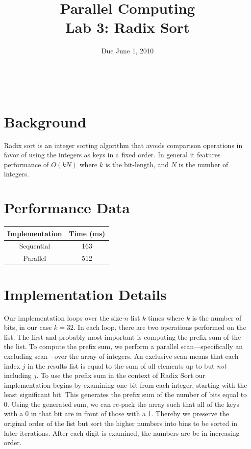\documentclass[12pt]{article}
\title{ Parallel Computing \\ Lab 3: Radix Sort }
\author{\MyFullName}
\date{ Due June 1, 2010 }
\renewcommand{\indent}{\hspace{0.25in}}
\begin{document}
\maketitle
\thispagestyle{empty}
\begin{center}
\end{center}
\setcounter{page}{0}
\newpage

\def\thesection{\Roman{section}.}
\hfill \\
\section{ Background }

\indent Radix sort is an integer sorting algorithm that avoids comparison operations in favor of using the integers as keys in a fixed order. 
In general it features performance of $O(k N)$ where $k$ is the bit-length, and $N$ is the number of integers.

\section{ Performance Data }
\begin{center}
\begin{tabular}{ c | c }

\textbf{Implementation} & \textbf{Time} (ms) \\ \hline
Sequential & 163 \\ 
Parallel & 512 \\ 
\end{tabular}
\end{center}

\section{ Implementation Details }
\indent  Our implementation loops over the size-$n$ list $k$ times where $k$ is the number of bits, in our case $k = 32$.   
In each loop, there are two operations performed on the list.  
The first and probably most important is computing the prefix sum of the the list.  
To compute the prefix sum, we perform a parallel scan---specifically an excluding scan---over the array of integers. 
An exclusive scan means that each index $j$ in the results list is equal to the sum of all elements up to but \emph{not} including $j$.  
To use the prefix sum in the context of Radix Sort our implementation begins by examining one bit from each integer, starting with the least significant bit. 
This generates the prefix sum of the number of bits equal to 0.  
Using the generated sum, we can re-pack the array such that all of the keys with a 0 in that bit are in front of those with a 1. Thereby we preserve the original order of the list but sort the higher numbers into bins to be sorted in later iterations. 
After each digit is examined, the numbers are be in increasing order. 
\end{document}
